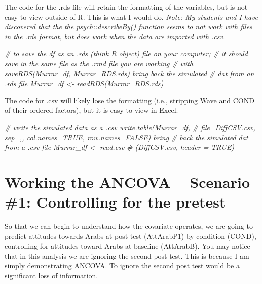 \documentclass[
  11pt,
]{book}
\newenvironment{Shaded}{\begin{snugshade}}{\end{snugshade}}
\newcommand{\CommentTok}[1]{\textcolor[rgb]{0.37,0.37,0.37}{\textit{#1}}}
\begin{document}
The code for the .rds file will retain the formatting of the variables, but is not easy to view outside of R. This is what I would do. \emph{Note: My students and I have discovered that the the psych::describeBy() function seems to not work with files in the .rds format, but does work when the data are imported with .csv.}

\begin{Shaded}
\begin{Highlighting}[]
\CommentTok{\# to save the df as an .rds (think \textquotesingle{}R object\textquotesingle{}) file on your computer;}
\CommentTok{\# it should save in the same file as the .rmd file you are working}
\CommentTok{\# with saveRDS(Murrar\_df, \textquotesingle{}Murrar\_RDS.rds\textquotesingle{}) bring back the simulated}
\CommentTok{\# dat from an .rds file Murrar\_df \textless{}{-} readRDS(\textquotesingle{}Murrar\_RDS.rds\textquotesingle{})}
\end{Highlighting}
\end{Shaded}

The code for .csv will likely lose the formatting (i.e., stripping Wave and COND of their ordered factors), but it is easy to view in Excel.

\begin{Shaded}
\begin{Highlighting}[]
\CommentTok{\# write the simulated data as a .csv write.table(Murrar\_df,}
\CommentTok{\# file=\textquotesingle{}DiffCSV.csv\textquotesingle{}, sep=\textquotesingle{},\textquotesingle{}, col.names=TRUE, row.names=FALSE) bring}
\CommentTok{\# back the simulated dat from a .csv file Murrar\_df \textless{}{-} read.csv}
\CommentTok{\# (\textquotesingle{}DiffCSV.csv\textquotesingle{}, header = TRUE)}
\end{Highlighting}
\end{Shaded}

\hypertarget{working-the-ancova-scenario-1-controlling-for-the-pretest}{%
\section{Working the ANCOVA -- Scenario \#1: Controlling for the pretest}\label{working-the-ancova-scenario-1-controlling-for-the-pretest}}

So that we can begin to understand how the covariate operates, we are going to predict attitudes towards Arabs at post-test (AttArabP1) by condition (COND), controlling for attitudes toward Arabs at baseline (AttArabB). You may notice that in this analysis we are ignoring the second post-test. This is because I am simply demonstrating ANCOVA. To ignore the second post test would be a significant loss of information.
\end{document}

